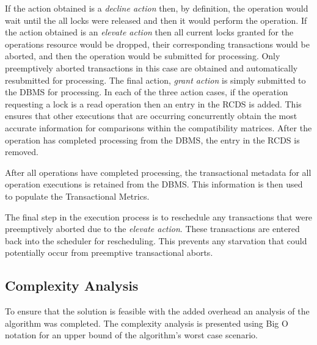\documentclass[conference]{IEEEtran}
\begin{document}
If the action obtained is a \textit{decline action} then, by definition, the operation would wait until the all locks were released and then it would perform the operation. If the action obtained is an \textit{elevate action} then all current locks granted for the operations resource would be dropped, their corresponding transactions would be aborted, and then the operation would be submitted for processing. Only preemptively aborted transactions in this case are obtained and automatically resubmitted for processing. The final action, \textit{grant action} is simply submitted to the DBMS for processing. In each of the three action cases, if the operation requesting a lock is a read operation then an entry in the RCDS is added. This ensures that other executions that are occurring concurrently obtain the most accurate information for comparisons within the compatibility matrices. After the operation has completed processing from the DBMS, the entry in the RCDS is removed.

After all operations have completed processing, the transactional metadata for all operation executions is retained from the DBMS. This information is then used to populate the Transactional Metrics. 


The final step in the execution process is to reschedule any transactions that were preemptively aborted due to the \textit{elevate action}. These transactions are entered back into the scheduler for rescheduling. This prevents any starvation that could potentially occur from preemptive transactional aborts.

\subsection{Complexity Analysis}
To ensure that the solution is feasible with the added overhead an analysis of the algorithm was completed. The complexity analysis is presented using Big O notation for an upper bound of the algorithm's worst case scenario.

\end{document}

